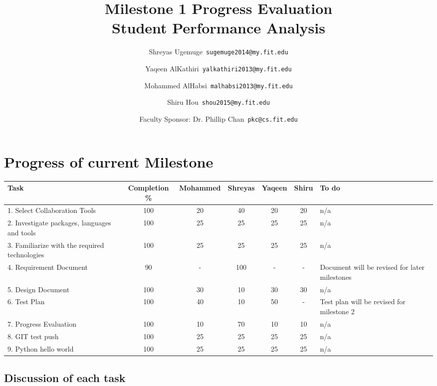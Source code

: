 \documentclass[12pt]{article}
\begin{document}
	\title{\textbf{Milestone 1 Progress Evaluation} \\ \hfill \break
	Student Performance Analysis}
	\author{Shreyas Ugemuge\      \texttt{sugemuge2014@my.fit.edu}
  \and
  Yaqeen AlKathiri\      \texttt{yalkathiri2013@my.fit.edu}
  \and
	Mohammed AlHabsi\      \texttt{malhabsi2013@my.fit.edu}
  \and
  Shiru Hou\      \texttt{shou2015@my.fit.edu}
  \and
  Faculty Sponsor: Dr. Phillip Chan\      \texttt{pkc@cs.fit.edu}}
	\maketitle
	\pagebreak
	\singlespacing
	\tableofcontents
	\pagebreak
	\section{Progress of current Milestone}
	\begin{tabularx}{\textwidth}{|X|c|c|c|c|c|X|}
	\hline
	\textbf{Task} & \textbf{Completion \%} & \textbf{Mohammed} & \textbf{Shreyas} & \textbf{Yaqeen} & \textbf{Shiru} & \textbf{To do} \\ \hline
	1. Select Collaboration Tools & 100 & 20 & 40 & 20 & 20 & n/a \\ \hline
	2. Investigate packages, languages and tools & 100 & 25 & 25 & 25 & 25 & n/a \\ \hline
	3. Familiarize with the required technologies & 100 & 25 & 25 & 25 & 25 & n/a \\ \hline
	4. Requirement Document & 90 & - & 100 & - & - & Document will be revised for later milestones \\ \hline
	5. Design Document & 100 & 30 & 10 & 30 & 30 & n/a \\ \hline
	6. Test Plan & 100 & 40 & 10 & 50 & - & Test plan will be revised for milestone 2 \\ \hline
	7. Progress Evaluation & 100 & 10 & 70 & 10 & 10 & n/a \\ \hline
	8. GIT test push & 100 & 25 & 25 & 25 & 25 & n/a \\ \hline
	9. Python hello world & 100 & 25 & 25 & 25 & 25 & n/a \\ \hline
	\end{tabularx}

	\subsection{Discussion of each task}
\end{document}
